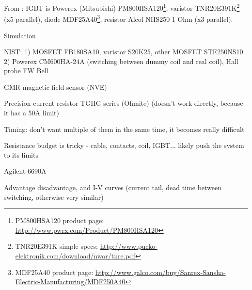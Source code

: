 \documentclass[12pt,a4paper]{article}
\begin{document}
From \cite{Yum2012}: IGBT is Powerex (Mitsubishi) PM800HSA120\footnote{PM800HSA120 product page: \url{http://www.pwrx.com/Product/PM800HSA120}}, varistor TNR20E391K\footnote{TNR20E391K simple specs: \url{http://www.pucko-elektronik.com/download/nwar/tnre.pdf}} (x5 parallel), diode MDF25A40\footnote{MDF25A40 product page: \url{http://www.galco.com/buy/Sanrex-Sansha-Electric-Manufacturing/MDF250A40}}, resistor Alcol NHS250 1 Ohm (x3 parallel).


Simulation


NIST: 1) MOSFET FB180SA10, varistor S20K25, other MOSFET STE250NS10 2) Powerex CM600HA-24A (switching between dummy coil and real coil), Hall probe FW Bell


GMR magnetic field sensor (NVE)

Precision current resistor TGHG series  (Ohmite) (doesn't work directly, because it has a 50A limit)

Timing: don't want multiple of them in the same time, it becomes really difficult


Resistance budget is tricky - cable, contacts, coil, IGBT... likely push the system to its limits

Agilent 6690A

Advantage disadvantage, and I-V curves \cite{Sattar} (current tail, dead time between switching, otherwise very similar)



\end{document}
